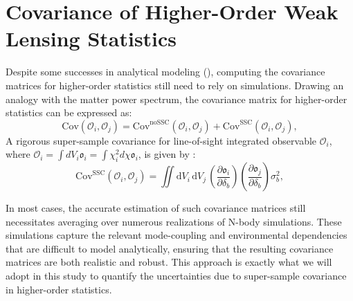 \section{Covariance of Higher-Order Weak Lensing Statistics}
Despite some successes in analytical modeling (\citealt{2018PhRvD..97d3532C, 2018A&A...611A..83L, 2019A&A...624A..61L, 2023OJAp....6E...1U}), computing the covariance matrices for higher-order statistics  still need to rely on simulations. Drawing an analogy with the matter power spectrum, the covariance matrix for higher-order statistics can be expressed as:
\begin{equation}
    \mathrm{Cov}(\mathcal{O}_i, \mathcal{O}_j) = \mathrm{Cov}^{\mathrm{noSSC}}(\mathcal{O}_i, \mathcal{O}_j) + \mathrm{Cov}^{\mathrm{SSC}}(\mathcal{O}_i, \mathcal{O}_j),
\end{equation}
A rigorous super-sample covariance for line-of-sight integrated observable $\mathcal{O}_i$, where $\mathcal{O}_i = \int dV_i \mathfrak{o}_i = \int \chi_i^2 d\chi \mathfrak{o}_i$, is given by \citep{2016JCAP...08..005L}:
\begin{equation}
    \mathrm{Cov}^{\mathrm{SSC}}(\mathcal{O}_i, \mathcal{O}_j) = 
    \iint \mathrm{d}V_i \, \mathrm{d}V_j \,
    \left(
        \frac{\partial \mathfrak{o}_i}{\partial \delta_b}
    \right)
    \left(
        \frac{\partial \mathfrak{o}_j}{\partial \delta_b}
    \right)
    \sigma_b^2, 
\end{equation}

In most cases, the accurate estimation of such covariance matrices still necessitates averaging over numerous realizations of N-body simulations. These simulations capture the relevant mode-coupling and environmental dependencies that are difficult to model analytically, ensuring that the resulting covariance matrices are both realistic and robust. This approach is exactly what we will adopt in this study to quantify the uncertainties due to super-sample covariance in higher-order statistics. 